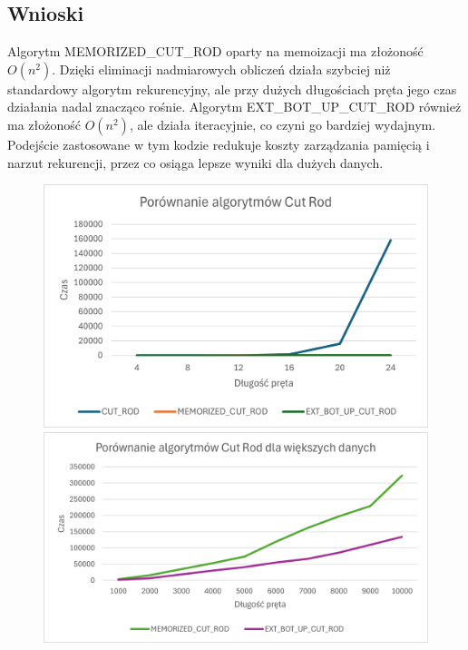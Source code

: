 \documentclass{article}
\begin{document}
	\subsection*{Wnioski} 
	Algorytm MEMORIZED\_CUT\_ROD oparty na memoizacji ma złożoność $O(n^2)$. Dzięki eliminacji nadmiarowych obliczeń działa szybciej niż standardowy algorytm rekurencyjny, ale przy dużych długościach pręta jego czas działania nadal znacząco rośnie. 
	Algorytm EXT\_BOT\_UP\_CUT\_ROD również ma złożoność $O(n^2)$, ale działa iteracyjnie, co czyni go bardziej wydajnym. Podejście zastosowane w tym kodzie redukuje koszty zarządzania pamięcią i narzut rekurencji, przez co osiąga lepsze wyniki dla dużych danych.
	
	\begin{figure}[H]
		\begin{minipage}{0.465\textwidth}
			\centering
			\includegraphics[width=\textwidth]{PorCR.png}
		\end{minipage}%
		\begin{minipage}{0.535\textwidth}
			\centering
			\includegraphics[width=\textwidth]{PorCR2.png}
		\end{minipage}
	\end{figure}
	
\end{document}
